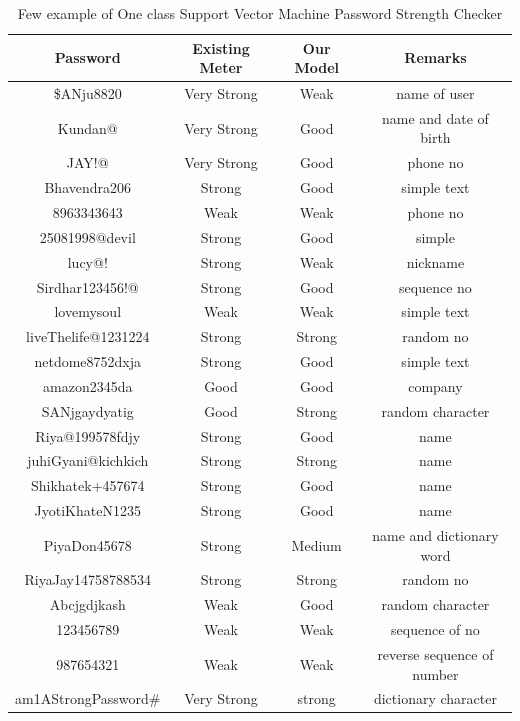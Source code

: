\documentclass[runningheads]{llncs}
\begin{document}
\begin{table}[htb]
\caption{Few example of One class Support Vector Machine Password Strength Checker}
\begin{tabular}{||c||c||c||c||}
	\hline
	\hline
	\textbf{Password} & \textbf{Existing Meter} & \textbf{Our Model}&\textbf{Remarks} \\
	\hline
	
     \$ANju8820   & Very Strong & Weak & name of user \\
 \hline
 Kundan@#1994  & Very Strong  & Good & name and date of birth \\
 \hline
 JAY!@#882037820  & Very Strong & Good & phone no \\
 \hline
 Bhavendra206 & Strong & Good & simple text\\
 \hline
 8963343643 & Weak & Weak & phone no\\
 \hline
 25081998@devil & Strong & Good & simple\\
 \hline
 lucy@!#9863 & Strong & Weak  & nickname\\
 \hline
 Sirdhar123456!@ & Strong & Good& sequence no\\
 \hline
 lovemysoul & Weak & Weak& simple text\\
 \hline
 liveThelife@1231224 & Strong& Strong& random no\\
 \hline
 netdome8752dxja &Strong &Good& simple text\\
 \hline
 amazon2345da & Good & Good& company\\ 
 \hline
 SANjgaydyatig & Good & Strong& random character\\
 \hline
 Riya@199578fdjy & Strong & Good& name\\
 \hline
 juhiGyani@kichkich & Strong& Strong& name\\
 \hline
 Shikhatek+457674 &Strong & Good& name\\
 \hline
 JyotiKhateN1235 & Strong & Good& name\\
 \hline
 PiyaDon45678 & Strong & Medium& name and dictionary word\\
 \hline
 RiyaJay14758788534 & Strong & Strong& random no\\
\hline
Abcjgdjkash & Weak & Good& random character\\
\hline
123456789 & Weak & Weak& sequence of no\\
\hline
987654321 & Weak & Weak&reverse sequence of number\\
\hline
am1AStrongPassword# & Very Strong & strong& dictionary character\\ 

\end{tabular}
\end{table}
\end{document}
